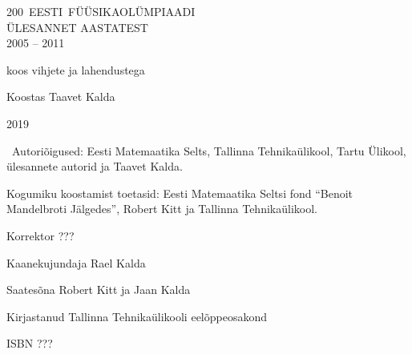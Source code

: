 \documentclass[11pt, twoside]{article}
\begin{document}
\begin{titlepage}
	\centering
	\vspace{10cm}
	{\sffamily\Huge \mbox{200 EESTI FÜÜSIKAOLÜMPIAADI}\\ ÜLESANNET AASTATEST\\ 2005 -- 2011\par}
	\vspace{1cm}
	{\Large koos vihjete ja lahendustega\par}
	\vfill
	{\Large Koostas Taavet Kalda}

	\vfill

	{\large 2019}
\end{titlepage}

\raggedbottom %
\mbox{}\vfill

\textcopyright~Autoriõigused: Eesti Matemaatika Selts, Tallinna Tehnikaülikool,
Tartu Ülikool, ülesannete autorid ja Taavet Kalda.
\vspace{0.5\baselineskip}

Kogumiku koostamist toetasid: Eesti Matemaatika Seltsi fond ``Benoit Mandelbroti Jälgedes'', Robert Kitt ja Tallinna Tehnikaülikool.
\vspace{0.5\baselineskip}


Korrektor ???

Kaanekujundaja Rael Kalda

Saatesõna Robert Kitt ja Jaan Kalda
\vspace{0.5\baselineskip}

Kirjastanud Tallinna Tehnikaülikooli eelõppeosakond
\vspace{0.5\baselineskip}

ISBN ???
\newpage

\tableofcontents
\newpage
\end{document}

